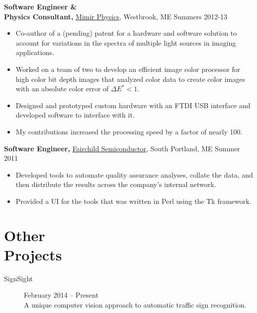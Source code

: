 \documentclass[margin]{res}
\begin{document}
\begin{resume}
{\bf Software Engineer \& \\ Physics Consultant,} \uline{Mimir Physics}, Westbrook, ME \hfill Summers 2012-13
 \begin{itemize} \itemsep -2pt  %
 \item Co-author of a (pending) patent for a hardware and software solution to account for variations in the spectra of multiple light sources in imaging applications.
 \item Worked on a team of two to develop an efficient image color processor for high color bit depth images that analyzed color data to create color images with an absolute color error of $\Delta E^* < 1$.
 \item Designed and prototyped custom hardware with an FTDI USB interface  and developed software to interface with it.
 \item My contributions increased the processing speed by a factor of nearly 100.
 \end{itemize}

 
 
{\bf Software Engineer,} \uline{Fairchild Semiconductor}, South Portland, ME \hfill  Summer 2011
\begin{itemize} \itemsep -2pt %
 \item Developed tools to automate quality assurance analyses, collate the data, and then distribute the results across the company's internal network.
 \item Provided a UI for the tools that was written in Perl using the Tk framework.
\end{itemize}

\section{Other \\ Projects}
\begin{description}
	\item[SignSight] \hfill February 2014 -- Present \\
		A unique computer vision approach to automatic traffic sign recognition.
\end{description}


\end{resume}
\end{document}
